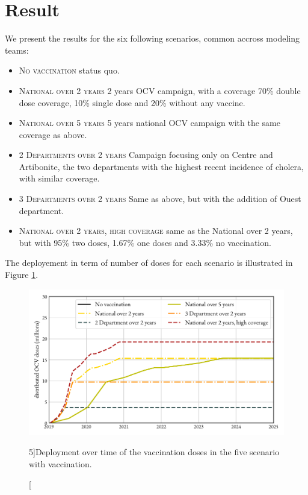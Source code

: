 \section{Result}

We present the results for the six following scenarios, common accross modeling teams:
\begin{itemize}
	\item \textsc{No vaccination} status quo.
	\item \textsc{National over 2 years} 2 years OCV campaign, with a coverage 70\% double dose coverage, 10\% single dose and 20\% without any vaccine.
	\item 	 \textsc{National over 5 years} 5 years national OCV campaign with the same coverage as above.
	\item \textsc{2 Departments over 2 years} Campaign focusing only on Centre and Artibonite, the two departments with the highest recent incidence of cholera, with similar coverage.
	\item \textsc{3 Departments over 2 years} Same as above, but with the addition of Ouest department.
	\item \textsc{National over 2 years, high coverage} same as the National over 2 years, but with 95\% two doses, 1.67\% one doses and 3.33\% no vaccination.
\end{itemize}
The deployement in term of number of doses for each scenario is illustrated in Figure \ref{fig:deploy}.

\begin{figure}
\begin{center}
\includegraphics{fig_cholera-haiti-ocv/haiti-deploy.pdf}
\caption[Deployment the vaccination doses in the scenarios.][5\baselineskip]{Deployment over time of the vaccination doses in the five scenario with vaccination.}\label{fig:deploy}
\end{center}
\end{figure}

